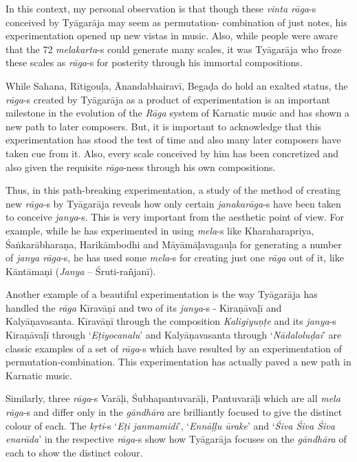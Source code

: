 In this context, my personal observation is that though these \textit{vinta rāga}-s conceived by Tyāgarāja may seem as permutation- combination of just notes, his experimentation opened up new vistas in music. Also, while people were aware that the 72 \textit{melakarta}-s could generate many scales, it was Tyāgarāja who froze these scales as \textit{rāga}-s for posterity through his immortal compositions.

While Sahana, Rītigouḷa, Ānandabhairavī, Begaḍa do hold an exalted status, the \textit{rāga}-s created by Tyāgarāja as a product of experimentation is an important milestone in the evolution of the \textit{Rāga} system of Karnatic music and has shown a new path to later composers. But, it is important to acknowledge that this experimentation has stood the test of time and also many later composers have taken cue from it. Also, every scale conceived by him has been concretized and also given the requisite \textit{rāga}-ness through his own compositions.

Thus, in this path-breaking experimentation, a study of the method of creating new \textit{rāga}-s by Tyāgarāja reveals how only certain \textit{janaka\break rāga}-s have been taken to conceive \textit{janya}-s. This is very important from the aesthetic point of view. For example, while he has experimented in using \textit{mela}-s like Kharaharapriya, Śaṅkarābharaṇa, Harikāmbodhi and Māyāmāḷavagauḷa for generating a number of \textit{janya rāga}-s, he has used some \textit{mela}-s for creating just one \textit{rāga} out of it, like Kāntāmaṇi (\textit{Janya} – Śruti-rañjanī).

Another example of a beautiful experimentation is the way Tyāgarāja has handled the \textit{rāga} Kīravāṇī and two of its \textit{janya}-s - Kiraṇāvaḷī and Kalyāṇavasanta. Kīravāṇī through the composition \textit{Kaligiyuṇṭe} and its \textit{janya}-s Kiraṇāvaḷī through ‘\textit{Eṭiyocanalu}’ and Kalyāṇavasanta through ‘\textit{Nādaloluḍai}’ are classic examples of a set of \textit{rāga}-s which have resulted by an experimentation of permutation-combination. This experimentation has actually paved a new path in Karnatic music.

Similarly, three \textit{rāga}-s Varāḷi, Śubhapantuvarāḷi, Pantuvarāḷi which are all \textit{mela rāga}-s and differ only in the \textit{gāndhāra} are brilliantly focused to give the distinct colour of each. The \textit{kṛti}-s ‘\textit{Eṭi janmamidi}’, ‘\textit{Ennāḷḷu ūrake}’ and ‘\textit{Śiva Śiva Śiva enarāda}’ in the respective \textit{rāga}-s show how Tyāgarāja focuses on the \textit{gāndhāra} of each to show the distinct colour.

